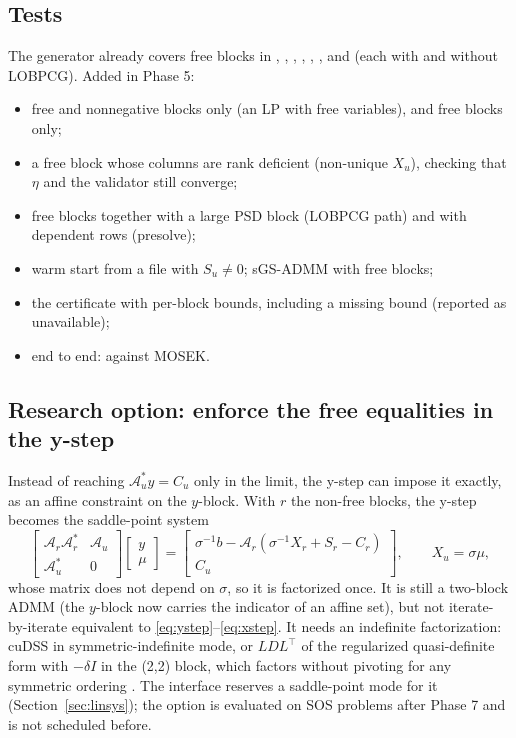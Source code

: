 \documentclass[11pt]{article}
\newcommand{\A}{\mathcal{A}}
\begin{document}
\subsection{Tests}
The generator already covers free blocks in , , ,
, , ,  and
 (each with and without LOBPCG). Added in Phase 5:
\begin{itemize}
  \item free and nonnegative blocks only (an LP with free variables), and free blocks only;
  \item a free block whose columns are rank deficient (non-unique $X_u$), checking that $\eta$ and the
  validator still converge;
  \item free blocks together with a large PSD block (LOBPCG path) and with dependent rows (presolve);
  \item warm start from a file with $S_u\neq0$; sGS-ADMM with free blocks;
  \item the certificate with per-block bounds, including a missing bound (reported as unavailable);
  \item end to end:  against MOSEK.
\end{itemize}

\subsection{Research option: enforce the free equalities in the y-step}
Instead of reaching $\A_u^* y = C_u$ only in the limit, the y-step can impose it exactly, as an affine
constraint on the $y$-block. With $r$ the non-free blocks, the y-step becomes the saddle-point system
\[
\begin{bmatrix} \A_r\A_r^* & \A_u \\ \A_u^* & 0 \end{bmatrix}
\begin{bmatrix} y \\ \mu \end{bmatrix} =
\begin{bmatrix} \sigma^{-1}b - \A_r(\sigma^{-1}X_r + S_r - C_r) \\ C_u \end{bmatrix},
\qquad X_u = \sigma\mu ,
\]
whose matrix does not depend on $\sigma$, so it is factorized once. It is still a two-block ADMM (the
$y$-block now carries the indicator of an affine set), but not iterate-by-iterate equivalent to
\eqref{eq:ystep}--\eqref{eq:xstep}. It needs an indefinite factorization: cuDSS in symmetric-indefinite mode,
or $LDL^\top$ of the regularized quasi-definite form with $-\delta I$ in the (2,2) block, which factors
without pivoting for any symmetric ordering \cite{vanderbei1995}. The  interface
reserves a saddle-point mode for it (Section~\ref{sec:linsys}); the option is evaluated on SOS problems
after Phase 7 and is not scheduled before.
\end{document}
